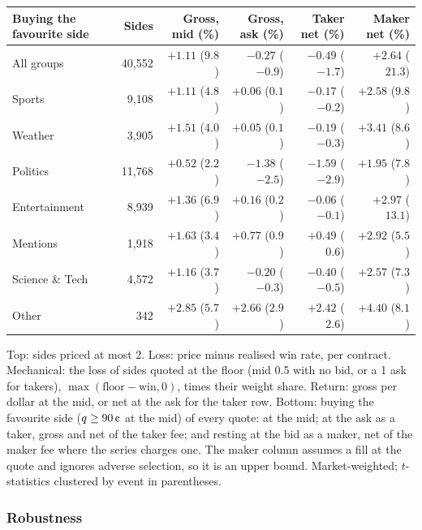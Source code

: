 \begin{table}[!htbp]
\begin{threeparttable}
\vspace{6pt}
\begin{tabular}{@{}lrrrrr@{}}
\toprule
Buying the favourite side & Sides & Gross, mid (\%) & Gross, ask (\%) & Taker net (\%) & Maker net (\%) \\
\midrule
All groups & 40{,}552 & $+1.11$ ($9.8$) & $-0.27$ ($-0.9$) & $-0.49$ ($-1.7$) & $+2.64$ ($21.3$) \\
Sports & 9{,}108 & $+1.11$ ($4.8$) & $+0.06$ ($0.1$) & $-0.17$ ($-0.2$) & $+2.58$ ($9.8$) \\
Weather & 3{,}905 & $+1.51$ ($4.0$) & $+0.05$ ($0.1$) & $-0.19$ ($-0.3$) & $+3.41$ ($8.6$) \\
Politics & 11{,}768 & $+0.52$ ($2.2$) & $-1.38$ ($-2.5$) & $-1.59$ ($-2.9$) & $+1.95$ ($7.8$) \\
Entertainment & 8{,}939 & $+1.36$ ($6.9$) & $+0.16$ ($0.2$) & $-0.06$ ($-0.1$) & $+2.97$ ($13.1$) \\
Mentions & 1{,}918 & $+1.63$ ($3.4$) & $+0.77$ ($0.9$) & $+0.49$ ($0.6$) & $+2.92$ ($5.5$) \\
Science \& Tech & 4{,}572 & $+1.16$ ($3.7$) & $-0.20$ ($-0.3$) & $-0.40$ ($-0.5$) & $+2.57$ ($7.3$) \\
Other & 342 & $+2.85$ ($5.7$) & $+2.66$ ($2.9$) & $+2.42$ ($2.6$) & $+4.40$ ($8.1$) \\
\bottomrule
\end{tabular}
\begin{tablenotes}\footnotesize
\item Top: sides priced at most 2\cents. Loss: price minus realised win rate, per contract.
Mechanical: the loss of sides quoted at the floor (mid 0.5\cents{} with no bid, or a 1\cents{} ask
for takers), $\max(\text{floor}-\text{win},0)$, times their weight share. Return: gross per dollar at
the mid, or net at the ask for the taker row. Bottom: buying the favourite side ($\q\ge 90\cents$ at
the mid) of every quote: at the mid; at the ask as a taker, gross and net of the taker fee; and
resting at the bid as a maker, net of the maker fee where the series charges one. The maker column
assumes a fill at the quote and ignores adverse selection, so it is an upper bound. Market-weighted;
$t$-statistics clustered by event in parentheses.
\end{tablenotes}
\end{threeparttable}
\end{table}

\subsubsection{Robustness}\label{sec:res-xs-robust}

